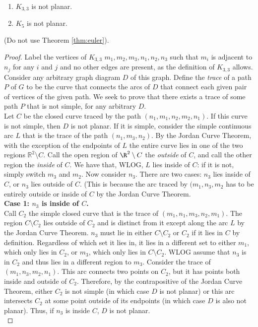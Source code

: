 \begin{theorem}\leavevmode
\begin{enumerate}
    \item $K_{3,3}$ is not planar.
    \item $K_5$ is not planar.
\end{enumerate}
(Do not use Theorem \ref{thm:euler}).
\end{theorem}
\begin{proof}
\item Label the vertices of $K_{3,3}$ $m_1, m_2, m_3, n_1, n_2, n_3$ such that $m_i$ is adjacent to $n_j$ for any $i$ and $j$ and no other edges are present, as the definition of $K_{3,3}$ allows. Consider any arbitrary graph diagram $D$ of this graph. Define the \textit{trace} of a path $P$ of $G$ to be the curve that connects the arcs of $D$ that connect each given pair of vertices of the given path. We seek to prove that there exists a trace of some path $P$ that is not simple, for any arbitrary $D$. \\
  Let $C$ be the closed curve traced by the path $(n_1, m_1, n_2, m_2, n_1)$. If this curve is not simple, then $D$ is not planar. If it is simple, consider the simple continuous arc $L$ that is the trace of the path $(n_1, m_3, n_2)$. By the Jordan Curve Theorem, with the exception of the endpoints of $L$ the entire curve lies in one of the two regions $\mathbb{R}^2 \setminus C$. Call the open region of $\R^2 \setminus C$ the \textit{outside} of $C$, and call the other region the \textit{inside} of $C$. We have that, WLOG, $L$ lies inside of $C$: if it is not, simply switch $m_3$ and $m_2$. Now consider $n_3$. There are two cases: $n_3$ lies inside of $C$, or $n_3$ lies outside of $C$. (This is because the arc traced by $(m_1, n_3, m_2$ has to be entirely outside or inside of $C$ by the Jordan Curve Theorem. \\
  \textbf{Case 1: $n_3$ is inside of $C$.} \\
  Call $C_2$ the simple closed curve that is the trace of $(m_1, n_1, m_3, n_2, m_1)$. The region $C \setminus C_2$ lies outside of $C_2$ and is distinct from it except along the arc $L$ by the Jordan Curve Theorem. $n_3$ must lie in either $C \setminus C_2$ or $C_2$ if it lies in $C$ by definition. Regardless of which set it lies in, it lies in a different set to either $m_1$, which only lies in $C_2$, or $m_3$, which only lies in $C \setminus C_2$. WLOG assume that $n_3$ is in $C_2$ and thus lies in a different region to $m_3$. Consider the trace of $(m_1, n_3, m_2, n_1)$. This arc connects two points on $C_2$, but it has points both inside and outside of $C_2$. Therefore, by the contrapositive of the Jordan Curve Theorem, either $C_2$ is not simple (in which case $D$ is not planar) or this arc intersects $C_2$ at some point outside of its endpoints (in which case $D$ is also not planar). Thus, if $n_3$ is inside $C$, $D$ is not planar. \\

\end{proof}
